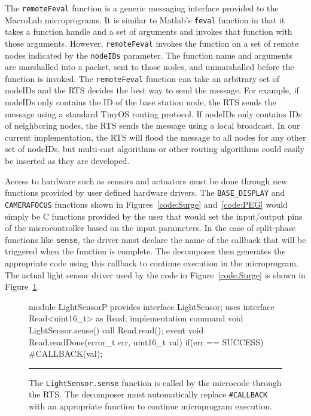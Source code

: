 The {\tt remoteFeval} function is a generic messaging interface
provided to the MacroLab microprograms.  It is similar to Matlab's
{\tt feval} function in that it takes a function handle and a set of
arguments and invokes that function with those arguments.  However,
{\tt remoteFeval} invokes the function on a set of remote nodes
indicated by the {\tt nodeIDs} parameter.  The function name and
arguments are marshalled into a packet, sent to those nodes, and
unmarshalled before the function is invoked.  The {\tt remoteFeval}
function can take an arbitrary set of nodeIDs and the RTS decides the
best way to send the message.  For example, if nodeIDs only contains
the ID of the base station node, the RTS sends the message using a
standard TinyOS routing protocol.  If nodeIDs only contains IDs of
neighboring nodes, the RTS sends the message using a local broadcast.
In our current implementation, the RTS will flood the message to all
nodes for any other set of nodeIDs, but multi-cast algorithms or other
routing algorithms could easily be inserted as they are developed.  

Access to hardware such as sensors and actuators must be done through
new functions provided by user defined hardware drivers.
The {\tt BASE\_DISPLAY} and {\tt CAMERAFOCUS} functions shown
in Figures~\ref{code:Surge} and~\ref{code:PEG} would simply be C
functions provided by the user that would set the input/output pins of
the microcontroller based on the input parameters.  In the case of
split-phase functions like {\tt sense}, the driver must declare the
name of the callback that will be triggered when the function is
complete.  The decomposer then generates the appropriate code using
this callback to continue execution in the microprogram.  
The actual light sensor driver used by the code in Figure~\ref{code:Surge} is
shown in Figure~\ref{code:hardwareDriver}.

\begin{figure}
  \begin{nesc}
module LightSensorP {
  provides interface LightSensor;
  uses interface Read<uint16_t> as Read;
}
implementation
{
  command void LightSensor.sense() {
    call Read.read();
  }
  event void Read.readDone(error_t err,
   uint16_t val) {
    if(err == SUCCESS) {
      #CALLBACK(val);
    }
  }
}
  \end{nesc}
  \smallskip
  \hrule width 1\columnwidth
  \caption[A split-phase hardware driver for reading from the light sensor.]{The
    {\tt LightSensor.sense} function is called by the microcode through the RTS.  The decomposer must
    automatically replace {\tt\#CALLBACK} with an appropriate function to continue
    microprogram execution.}
  \label{code:hardwareDriver}
\end{figure}


